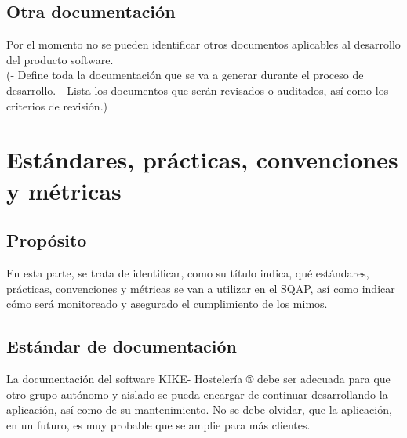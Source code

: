\documentclass[spanish,a4paper,11pt, twoside]{report}	%
\begin{document}
	\section{Otra documentación}
		Por el momento no se pueden identificar otros documentos aplicables al desarrollo del producto software.\\
	(- Define toda la documentación que se va a generar
	durante el proceso de desarrollo.
	- Lista los documentos que serán revisados o
	auditados, así como los criterios de revisión.)

\newpage
\mbox{}
\thispagestyle{empty}						%
\newpage

\chapter{ Estándares, prácticas, convenciones y métricas}

	\section{Propósito}
	En esta parte, se trata de identificar, como su título indica, qué estándares, prácticas, convenciones y métricas se van a utilizar en el SQAP, así como indicar cómo será monitoreado y asegurado el cumplimiento de los mimos.
	
	\section{Estándar de documentación}
	La documentación del software KIKE- Hostelería ® debe ser adecuada para que otro grupo autónomo y aislado se pueda encargar de continuar desarrollando la aplicación, así como de su mantenimiento. No se debe olvidar, que la aplicación, en un futuro, es muy probable que se amplie para más clientes.
\end{document}
